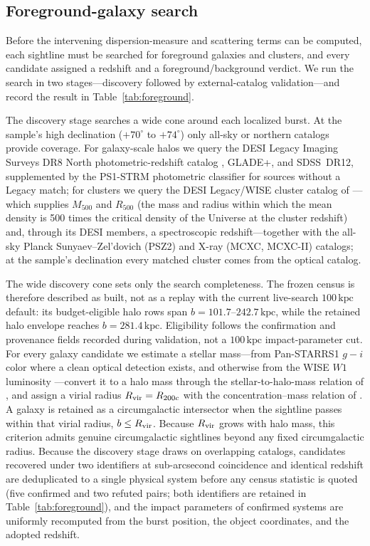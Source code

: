 \subsection{Foreground-galaxy search}
\label{sec:obs-fg}

Before the intervening dispersion-measure and scattering terms can be computed, each
sightline must be searched for foreground galaxies and clusters, and every
candidate assigned a redshift and a foreground/background verdict. We run the
search in two stages---discovery followed by external-catalog
validation---and record the result in Table~\ref{tab:foreground}.

The discovery stage searches a wide cone around each localized burst. At the
sample's high declination ($+70^\circ$ to $+74^\circ$) only all-sky or northern
catalogs provide coverage. For galaxy-scale halos we query the DESI Legacy
Imaging Surveys DR8 North photometric-redshift catalog \citep[the random-forest
estimator of][]{Zhou2021}, GLADE+, and SDSS~DR12, supplemented by the
PS1-STRM photometric classifier \citep{Beck2021} for sources
without a Legacy match; for clusters we query the DESI Legacy/WISE cluster
catalog of \citet{WenHan2024}---which supplies $M_{500}$ and $R_{500}$ (the
mass and radius within which the mean density is 500 times the critical
density of the Universe at the cluster redshift) and,
through its DESI members, a spectroscopic redshift---together with the all-sky
Planck Sunyaev--Zel'dovich (PSZ2) and X-ray (MCXC, MCXC-II) catalogs; at the
sample's declination every matched cluster comes from the optical catalog.

The wide discovery cone sets only the search completeness. The frozen census is
therefore described as built, not as a replay with the current live-search
$100\,\mathrm{kpc}$ default: its budget-eligible halo rows span
$b=101.7$--$242.7\,\mathrm{kpc}$, while the retained halo envelope reaches
$b=281.4\,\mathrm{kpc}$. Eligibility follows the confirmation and provenance
fields recorded during validation, not a $100\,\mathrm{kpc}$ impact-parameter
cut. For every galaxy candidate we estimate a stellar mass---from Pan-STARRS1
$g-i$ color \citep[the][relation]{Taylor2011} where a clean optical detection
exists, and otherwise from the WISE $W1$ luminosity \citep{Cluver2014}---convert
it to a halo mass through the stellar-to-halo-mass relation of
\citet{Moster2013}, and assign a virial radius $R_{\rm vir}=R_{200c}$ with the
concentration--mass relation of \citet{DuttonMaccio2014}. A galaxy is retained
as a circumgalactic intersector when the sightline passes within that virial
radius, $b \le R_{\rm vir}$. Because $R_{\rm vir}$ grows with halo mass, this
criterion admits genuine circumgalactic sightlines beyond any fixed
circumgalactic radius. Because the discovery stage draws on overlapping
catalogs, candidates recovered under two identifiers at sub-arcsecond
coincidence and identical redshift are deduplicated to a single physical
system before any census statistic is quoted (five confirmed and two refuted
pairs; both identifiers are retained in Table~\ref{tab:foreground}), and the
impact parameters of confirmed systems are uniformly recomputed from the
burst position, the object coordinates, and the adopted redshift.

